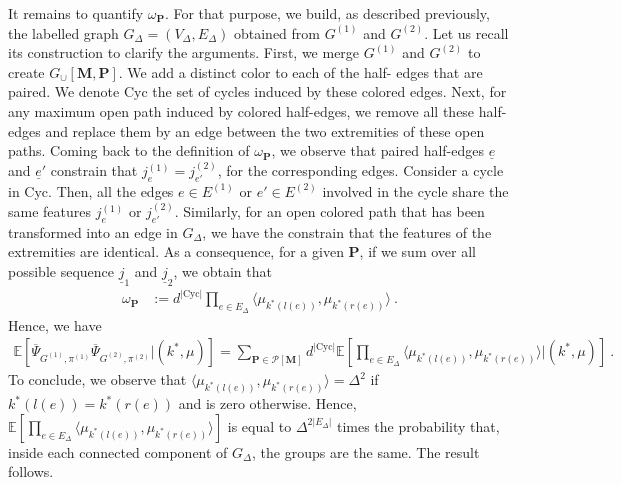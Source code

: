 \documentclass{article}
\begin{document}
            
            It remains to quantify $\omega_{\mathbf{P}}$. For that purpose, we build, as described previously, the labelled graph $G_{\Delta}=(V_{\Delta},E_{\Delta})$ obtained from $G^{(1)}$ and $G^{(2)}$. Let us recall its construction to clarify the arguments. 
            First, we merge $G^{(1)}$ and $G^{(2)}$ to create $G_{\cup}[\mathbf{M}, \mathbf{P}]$. We add a distinct color to each of the half- edges that are paired. We denote $\mathrm{Cyc}$ the set of cycles induced by these colored edges. Next, for any maximum open path induced by colored half-edges,  we remove all these half-edges and replace them by an edge between the two extremities of these open paths. Coming back to the definition of $  \omega_{\mathbf{P}}$, we observe that paired half-edges $\underline{e}$ and $\underline{e}'$ constrain that $j^{(1)}_{e}=j^{(2)}_{e'}$, for the corresponding edges. Consider a cycle in $\mathrm{Cyc}$. Then, all the edges $e\in E^{(1)}$ or $e'\in E^{(2)}$ involved in the cycle share the same features $j^{(1)}_e$ or $j^{(2)}_{e'}$. Similarly, for an open colored path that has been transformed into an edge in $G_{\Delta}$, we have the constrain that the features of the extremities are identical. As a consequence, for a given $\mathbf{P}$, if we sum over all possible sequence $\underline{j}_1$ and $\underline{j}_2$, we obtain that  
            \begin{eqnarray*}
                \omega_{\mathbf{P}} &:= d^{|\mathrm{Cyc}|}\prod_{e\in E_{\Delta}} \langle \mu_{k^*(l(e))},  \mu_{k^*(r(e))}\rangle\ .
            \end{eqnarray*}
            Hence, we have 
            \begin{align}\label{eq:upper_cross_variance:conditional}
               \mathbb{E}\left[\overline{\Psi}_{G^{(1)},\pi^{(1)}} \overline{\Psi}_{G^{(2)},\pi^{(2)}}|(k^* ,\mu) \right]=  \sum_{\mathbf{P} \in \mathcal{P}[\mathbf{M}]} 
                d^{|\mathrm{Cyc}|} \mathbb{E}\left[\prod_{e\in E_{\Delta}} \langle \mu_{k^*(l(e))},  \mu_{k^*(r(e))}\rangle \big|(k^* ,\mu) \right]\ .
            \end{align}
            To conclude, we observe that $\langle \mu_{k^*(l(e))},  \mu_{k^*(r(e))}\rangle=\Delta^2$ if $k^*(l(e))= k^*(r(e))$ and is zero otherwise. Hence, 
            $\mathbb{E}\left[\prod_{e\in E_{\Delta}} \langle \mu_{k^*(l(e))},  \mu_{k^*(r(e))}\rangle \right]$ is equal to $\Delta^{2|E_{\Delta}|}$ times the probability that, inside each connected component of $G_{\Delta}$, the groups are the same. The result follows. 
            
\end{document}
